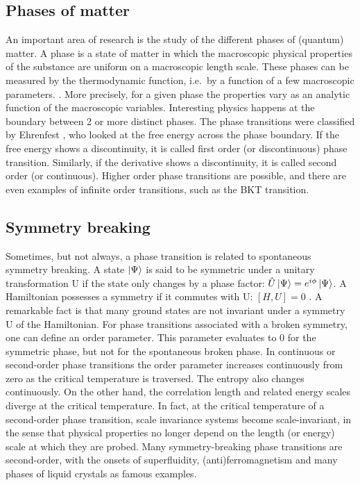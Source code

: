 \subsection{Phases of matter}

An important area of research is the study of the different phases of (quantum) matter. A phase is a state of matter in which the macroscopic physical properties of the substance are uniform on a macroscopic length scale. These phases can be measured by the thermodynamic function, i.e.\ by a function of a few macroscopic parameters. \cite{Nishimori2011}. More precisely, for a given phase the properties vary as an analytic function of the macroscopic variables.
Interesting physics happens at the boundary between 2 or more distinct phases. The phase transitions were classified by Ehrenfest \cite{Jaeger1998}, who looked at the free energy across the phase boundary. If the free energy shows a discontinuity, it is called first order (or discontinuous) phase transition. Similarly, if the derivative shows a discontinuity, it is called second order (or continuous). Higher order phase transitions are possible, and there are even examples of infinite order transitions, such as the BKT transition.

\subsection{Symmetry breaking}

Sometimes, but not always, a phase transition is  related to spontaneous symmetry breaking. A state $\ket{\Psi}$ is said to be symmetric under a unitary transformation U if the state only changes by a phase factor: $ \hat{U} \ket{\Psi} = e^{i \phi} \ket{\Psi} $. A Hamiltonian possesses a symmetry if it commutes with U: $ [H,U]=0$  \cite{Beekman2019}. A remarkable fact is that many ground states are not invariant under a symmetry U of the Hamiltonian.
For phase transitions associated with a broken symmetry, one can define an order parameter. This parameter evaluates to 0 for the symmetric phase, but not for the spontaneous broken phase.
In continuous or second-order phase transitions the order parameter increases continuously from zero as the critical temperature is traversed. The entropy also changes continuously. On the other hand, the correlation length and related energy scales diverge at the critical temperature. In fact, at the critical temperature of a second-order phase transition, scale invariance systems become scale-invariant, in the sense that physical properties no longer depend on the length (or energy) scale at which they are probed. Many symmetry-breaking phase transitions are second-order, with the onsets of superfluidity, (anti)ferromagnetism and many phases of liquid crystals as famous examples\cite{Beekman2019}.

